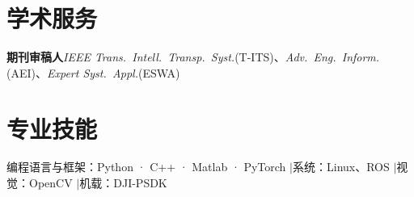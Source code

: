 \documentclass[10.5pt,a4paper]{ctexart}
\begin{document}
\section{学术服务}
\noindent\textbf{期刊审稿人}\quad \textit{IEEE Trans.\ Intell.\ Transp.\ Syst.}(T-ITS)、\textit{Adv.\ Eng.\ Inform.}(AEI)、\textit{Expert Syst.\ Appl.}(ESWA)

\section{专业技能}
\noindent 编程语言与框架：Python · C++ · Matlab · PyTorch \quad$|$\quad 系统：Linux、ROS     \quad$|$\quad 视觉：OpenCV \quad$|$\quad 机载：DJI-PSDK
\end{document}
